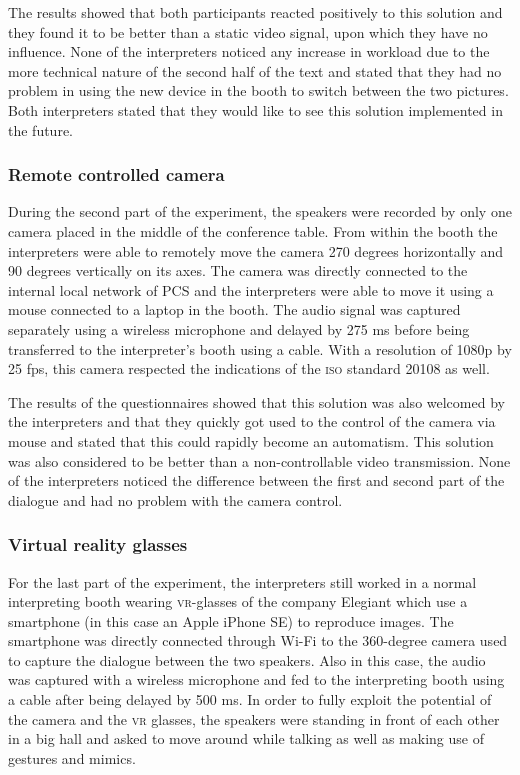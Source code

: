 \documentclass[output=paper]{langsci/langscibook}
\begin{document}
The results showed that both participants reacted positively to this solution and they found it to be better than a static video signal, upon which they have no influence. None of the interpreters noticed any increase in workload due to the more technical nature of the second half of the text and stated that they had no problem in using the new device in the booth to switch between the two pictures. Both interpreters stated that they would like to see this solution implemented in the future.

\subsubsection{Remote controlled camera}

During the second part of the experiment, the speakers were recorded by only one camera placed in the middle of the conference table. From within the booth the interpreters were able to remotely move the camera 270 degrees horizontally and 90 degrees vertically on its axes. The camera was directly connected to the internal local network of PCS and the interpreters were able to move it using a mouse connected to a laptop in the booth. The audio signal was captured separately using a wireless microphone and delayed by 275 ms before being transferred to the interpreter’s booth using a cable. With a resolution of 1080p by 25 fps, this camera respected the indications of the \textsc{iso} standard 20108 as well. 

The results of the questionnaires showed that this solution was also welcomed by the interpreters and that they quickly got used to the control of the camera via mouse and stated that this could rapidly become an automatism. This solution was also considered to be better than a non-controllable video transmission. None of the interpreters noticed the difference between the first and second part of the dialogue and had no problem with the camera control.

\subsubsection{Virtual reality glasses}

For the last part of the experiment, the interpreters still worked in a normal interpreting booth wearing \textsc{vr}-glasses of the company Elegiant which use a smartphone (in this case an Apple iPhone SE) to reproduce images. The smartphone was directly connected through Wi-Fi to the 360-degree camera used to capture the dialogue between the two speakers. Also in this case, the audio was captured with a wireless microphone and fed to the interpreting booth using a cable after being delayed by 500 ms. In order to fully exploit the potential of the camera and the \textsc{vr} glasses, the speakers were standing in front of each other in a big hall and asked to move around while talking as well as making use of gestures and mimics.
\end{document}
